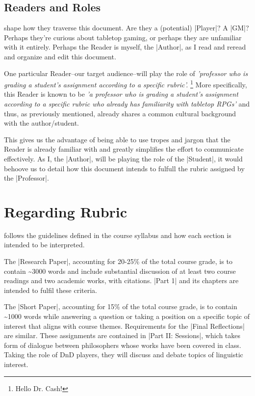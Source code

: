 \documentclass[10pt,twoside,twocolumn,openany,nomultitoc]{book}
\begin{document}
 \subsection{Readers and Roles}   
     shape how they traverse this document.  Are they a (potential) |Player|? A |GM|? Perhaps they're curious about tabletop gaming, or perhaps they are unfamiliar with it entirely. Perhaps the Reader is myself, the |Author|, as I read and reread and organize and edit this document.

One particular Reader--our target audience--will play the role of \textit{'professor who is grading a student's assignment according to a specific rubric'.}%
        \footnote{Hello Dr. Cash!} 
More specifically, this Reader is known to be \textit{'a professor who is grading a student's assignment according to a specific rubric who already has familiarity with tabletop RPGs'} and thus, as previously mentioned, already shares a common cultural background with the author/student.

This gives us the advantage of being able to use tropes and jargon that the Reader is already familiar with and greatly simplifies the effort to communicate effectively. As I, the |Author|, will be playing the role of the |Student|, it would behoove us to detail how this document intends to fulfull the rubric assigned by the |Professor|. 
 
 \section{Regarding Rubric}\vspace{6pt}
     follows the guidelines defined in the course syllabus and how each section is intended to be interpreted. 
    
The |Research Paper|, accounting for 20-25\% of the total course grade, is to contain \textasciitilde 3000 words and include substantial discussion of at least two course readings and two academic works, with citations. |Part 1| and its chapters are intended to fulfil these criteria. %
    
The |Short Paper|, accounting for 15\% of the total course grade, is to contain \textasciitilde 1000 words while answering a question or taking a position on a specific topic of interest that aligns with course themes. Requirements for the |Final Reflections| are similar. These assignments are contained in |Part II: Sessions|, which takes form of dialogue between philosophers whose works have been covered in class. Taking the role of DnD players, they will discuss and debate topics of linguistic interest. 
    
\end{document}
